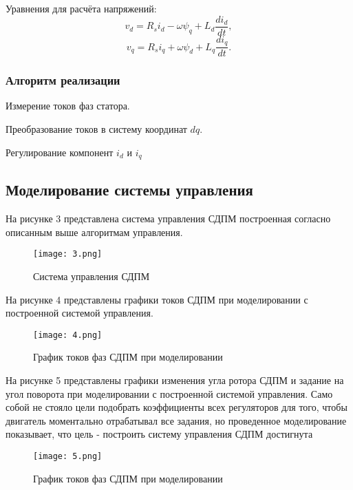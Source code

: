 \documentclass[a4paper,14pt]{extarticle} %
\begin{document}
Уравнения для расчёта напряжений:
\begin{equation}
v_d = R_s i_d - \omega \psi_q + L_d \frac{di_d}{dt},
\end{equation}
\begin{equation}
v_q = R_s i_q + \omega \psi_d + L_q \frac{di_q}{dt}.
\end{equation}

\subsubsection*{Алгоритм реализации}

Измерение токов фаз статора.

Преобразование токов в систему координат $dq$.

Регулирование компонент $i_d$ и $i_q$


\subsection*{Моделирование системы управления}

На рисунке 3 представлена система управления СДПМ построенная согласно описанным выше алгоритмам управления.

\begin{figure}[h]
    \centering
    \texttt{[image: 3.png]}
    \caption{Система управления СДПМ}
    \label{fig:mpr}
\end{figure}

На рисунке 4 представлены графики токов СДПМ при моделировании с построенной системой управления.

\begin{figure}[h]
    \centering
    \texttt{[image: 4.png]}
    \caption{График токов фаз СДПМ при моделировании}
    \label{fig:mpr}
\end{figure}

На рисунке 5 представлены графики изменения угла ротора СДПМ и задание на угол поворота при моделировании с построенной системой управления. Само собой не стояло цели подобрать коэффициенты всех регуляторов для того, чтобы двигатель моментально отрабатывал все задания, но проведенное моделирование показывает, что цель - построить систему управления СДПМ достигнута

\begin{figure}[h]
    \centering
    \texttt{[image: 5.png]}
    \caption{График токов фаз СДПМ при моделировании}
    \label{fig:mpr}
\end{figure}
\end{document}
